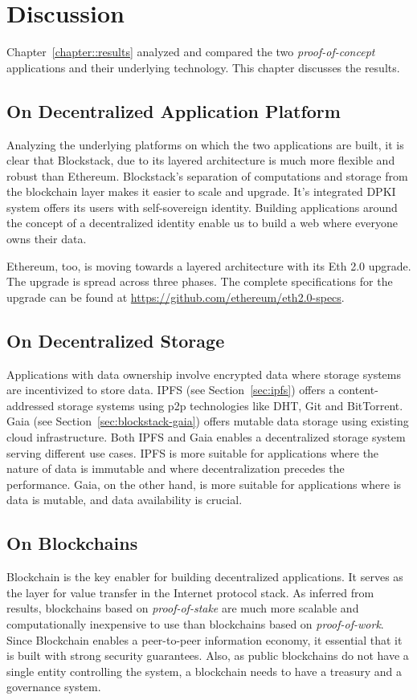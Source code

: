 \chapter{Discussion}\label{chapter::discussion}

	Chapter~\ref{chapter::results} analyzed and compared the two \textit{proof-of-concept} applications and their underlying technology. This chapter discusses the results.
	
	\section{On Decentralized Application Platform}
	Analyzing the underlying platforms on which the two applications are built, it is clear that Blockstack, due to its layered architecture is much more flexible and robust than Ethereum. Blockstack's separation of computations and storage from the blockchain layer makes it easier to scale and upgrade. It's integrated DPKI system offers its users with self-sovereign identity. Building applications around the concept of a decentralized identity enable us to build a web where everyone owns their data.
	
	Ethereum, too, is moving towards a layered architecture with its Eth 2.0 upgrade. The upgrade is spread across three phases. The complete specifications for the upgrade can be found at \url{https://github.com/ethereum/eth2.0-specs}.
	
	\section{On Decentralized Storage}
	Applications with data ownership involve encrypted data where storage systems are incentivized to store data. IPFS (see Section~\ref{sec:ipfs}) offers a content-addressed storage systems using p2p technologies like DHT, Git and BitTorrent. Gaia (see Section~\ref{sec:blockstack-gaia}) offers mutable data storage using existing cloud infrastructure. Both IPFS and Gaia enables a decentralized storage system serving different use cases. IPFS is more suitable for applications where the nature of data is immutable and where decentralization precedes the performance. Gaia, on the other hand, is more suitable for applications where is data is mutable, and data availability is crucial.
	
	\section{On Blockchains}
	Blockchain is the key enabler for building decentralized applications. It serves as the layer for value transfer in the Internet protocol stack. As inferred from results, blockchains based on \textit{proof-of-stake} are much more scalable and computationally inexpensive to use than blockchains based on \textit{proof-of-work}. Since Blockchain enables a peer-to-peer information economy, it essential that it is built with strong security guarantees. Also, as public blockchains do not have a single entity controlling the system, a blockchain needs to have a treasury and a governance system.
	